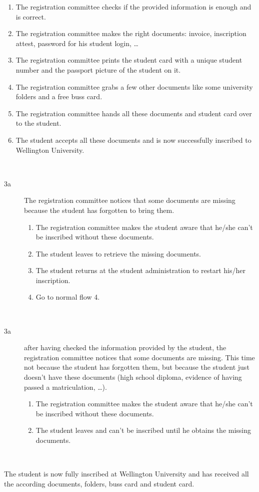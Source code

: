 \begin{description}
\begin{enumerate}
	  	(if necessary)
	  	\item The registration committee checks if the provided information is enough
	  	and is correct.
	  	\item The registration committee makes the right documents: invoice,
	  	inscription attest, password for his student login, \ldots
	  	\item The registration committee prints the student card with a unique
	  	student number and the passport picture of the student on it.
	  	\item The registration committee grabs a few other documents like some
	  	university folders and a free buss card.
	  	\item The registration committee hands all these documents and student card
	  	over to the student.
	  	\item The student accepts all these documents and is now successfully
	  	inscribed to Wellington University.
	\end{enumerate}
	\item[Alternative business flow] \ 
	\begin{description}
  		\item[3a] The registration committee notices that some documents are missing
  		because the student has forgotten to bring them.
  		\begin{enumerate}
  			\item The registration committee makes the student aware that he/she
  			can't be inscribed without these documents.
  			\item The student leaves to retrieve the missing documents.
  			\item The student returns at the student administration to restart his/her
  			inscription.
  			\item Go to normal flow 4.
		\end{enumerate}
	\end{description}
	\item[Exception business flow] \
	\begin{description}
		\item[3a] after having checked the information provided by the student, the
		registration committee notices that some documents are missing. This time not
		because the student has forgotten them, but because the student just doesn't
		have these documents (high school diploma, evidence of having passed a
		matriculation, \ldots).
		\begin{enumerate}
		  \item The registration committee makes the student aware that he/she can't be
		  inscribed without these documents.
		  \item The student leaves and can't be inscribed until he obtains the missing
		  documents.
		\end{enumerate}
	\end{description}
	\item[Outcome (postcondition)] \
	\par The student is now fully inscribed at Wellington University and has
	received all the according documents, folders, buss card and student card.
\end{description}
